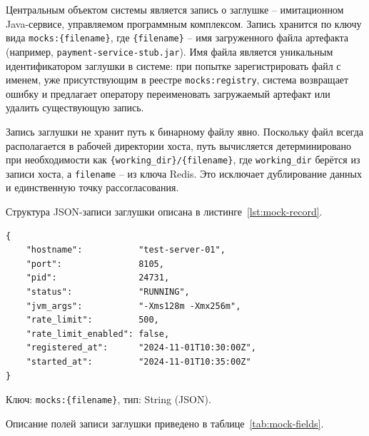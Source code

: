 Центральным объектом системы является запись о заглушке -- имитационном Java-сервисе, управляемом программным комплексом. Запись хранится по ключу вида \texttt{mocks:\{filename\}}, где \texttt{\{filename\}} -- имя загруженного файла артефакта (например, \texttt{payment-service-stub.jar}). Имя файла является уникальным идентификатором заглушки в системе: при попытке зарегистрировать файл с именем, уже присутствующим в реестре \texttt{mocks:registry}, система возвращает ошибку и предлагает оператору переименовать загружаемый артефакт или удалить существующую запись.

Запись заглушки не хранит путь к бинарному файлу явно. Поскольку файл всегда располагается в рабочей директории хоста, путь вычисляется детерминировано при необходимости как \texttt{\{working\_dir\}/\{filename\}}, где \texttt{working\_dir} берётся из записи хоста, а \texttt{filename} -- из ключа Redis. Это исключает дублирование данных и единственную точку рассогласования.

Структура JSON-записи заглушки описана в листинге~\ref{lst:mock-record}.

\begin{listing}[H]
\caption{Структура JSON-записи заглушки в Redis}
\label{lst:mock-record}
\begin{verbatim}
{
    "hostname":           "test-server-01",
    "port":               8105,
    "pid":                24731,
    "status":             "RUNNING",
    "jvm_args":           "-Xms128m -Xmx256m",
    "rate_limit":         500,
    "rate_limit_enabled": false,
    "registered_at":      "2024-11-01T10:30:00Z",
    "started_at":         "2024-11-01T10:35:00Z"
}
\end{verbatim}
\end{listing}

Ключ: \texttt{mocks:\{filename\}}, тип: String (JSON).

Описание полей записи заглушки приведено в таблице~\ref{tab:mock-fields}.


